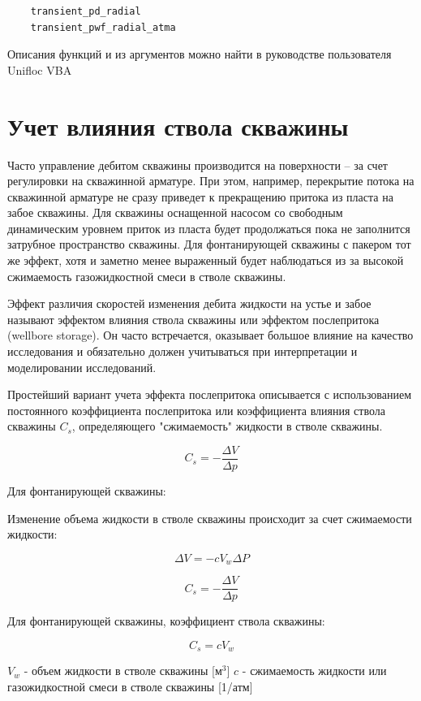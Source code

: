 \begin{verbatim}
	transient_pd_radial
	transient_pwf_radial_atma
\end{verbatim}	

Описания функций и из аргументов можно найти в руководстве пользователя  Unifloc VBA



\section{Учет влияния ствола скважины}
Часто управление дебитом скважины производится на поверхности -- за счет регулировки на скважинной арматуре. При этом, например, перекрытие потока на скважинной арматуре не сразу приведет к прекращению притока из пласта на забое скважины. Для скважины оснащенной насосом со свободным динамическим уровнем приток из пласта будет продолжаться пока не заполнится затрубное пространство скважины. Для фонтанирующей скважины с пакером тот же эффект, хотя и заметно менее выраженный будет наблюдаться из за высокой сжимаемость газожидкостной смеси в стволе скважины. 

Эффект различия скоростей изменения дебита жидкости на устье и забое называют эффектом влияния ствола скважины или эффектом послепритока (wellbore storage). Он часто встречается, оказывает большое влияние на качество исследования и обязательно должен учитываться при интерпретации и моделировании исследований.

Простейший вариант учета эффекта послепритока описывается с использованием постоянного коэффициента послепритока или коэффициента влияния ствола скважины $C_s$, определяющего "сжимаемость" жидкости в стволе скважины.

$$ C_s = - \frac{ \Delta V}{ \Delta p} $$

Для фонтанирующей скважины:

Изменение объема жидкости в стволе скважины происходит за счет сжимаемости жидкости:

$$ \Delta V = -c{V_w}{\Delta P} $$

$$ C_s = - \frac{ \Delta V}{ \Delta p} $$

Для фонтанирующей скважины, коэффициент ствола скважины:

$$ C_s =  c {V_w} $$

$ V_w $ - объем жидкости в стволе скважины  [м$^3$]
$c$ - сжимаемость жидкости или газожидкостной смеси в стволе скважины [1/атм]


